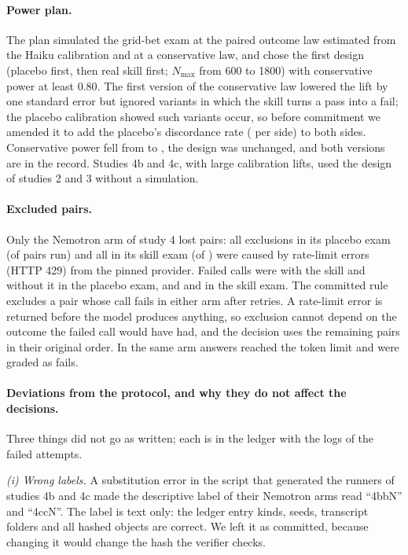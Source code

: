 \paragraph{Power plan.} The plan simulated the grid-bet exam at the paired outcome law estimated from the Haiku calibration and at a conservative law, and chose the first design (placebo first, then real skill first; $N_{\max}$ from 600 to 1800) with conservative power at least $0.80$. The first version of the conservative law lowered the lift by one standard error but ignored variants in which the skill turns a pass into a fail; the placebo calibration showed such variants occur, so before commitment we amended it to add the placebo's discordance rate (\NPowNoise{} per side) to both sides. Conservative power fell from \NPowConsVone{} to \NPowCons, the design was unchanged, and both versions are in the record. Studies 4b and 4c, with large calibration lifts, used the design of studies 2 and 3 without a simulation.

\paragraph{Excluded pairs.} Only the Nemotron arm of study 4 lost pairs: all \NLnFourPlacExcl{} exclusions in its placebo exam (of \NLnFourPlacRun{} pairs run) and all \NLnFourRealExcl{} in its skill exam (of \NLnFourRealRun) were caused by rate-limit errors (HTTP 429) from the pinned provider. Failed calls were \NLnFourPlacFailWith{} with the skill and \NLnFourPlacFailWithout{} without it in the placebo exam, and \NLnFourRealFailWith{} and \NLnFourRealFailWithout{} in the skill exam. The committed rule excludes a pair whose call fails in either arm after retries. A rate-limit error is returned before the model produces anything, so exclusion cannot depend on the outcome the failed call would have had, and the decision uses the remaining pairs in their original order. In the same arm \NLnFourCut{} answers reached the token limit and were graded as fails.

\paragraph{Deviations from the protocol, and why they do not affect the decisions.} Three things did not go as written; each is in the ledger with the logs of the failed attempts.

\emph{(i) Wrong labels.} A substitution error in the script that generated the runners of studies 4b and 4c made the descriptive label of their Nemotron arms read ``4bbN'' and ``4ccN''. The label is text only: the ledger entry kinds, seeds, transcript folders and all hashed objects are correct. We left it as committed, because changing it would change the hash the verifier checks.

